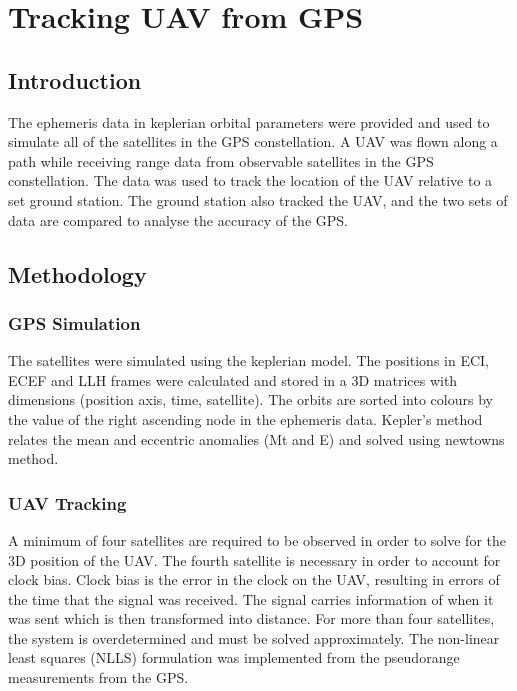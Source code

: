 \documentclass[Space3_Assign2]{subfile}
\begin{document}
\section{Tracking UAV from GPS}
\subsection{Introduction}
The ephemeris data in keplerian orbital parameters were provided and used to simulate all of the satellites in the GPS constellation. A UAV was flown along a path while receiving range data from observable satellites in the GPS constellation. The data was used to track the location of the UAV relative to a set ground station. The ground station also tracked the UAV, and the two sets of data are compared to analyse the accuracy of the GPS. 





\subsection{Methodology}
\subsubsection{GPS Simulation}
The satellites were simulated using the keplerian model. The positions in ECI, ECEF and LLH frames were calculated and stored in a 3D matrices with dimensions (position axis, time, satellite). The orbits are sorted into colours by the value of the right ascending node in the ephemeris data. Kepler's method relates the mean and eccentric anomalies (Mt and E) and solved using newtowns method.

\subsubsection{UAV Tracking}
A minimum of four satellites are required to be observed in order to solve for the 3D position of the UAV. The fourth satellite is necessary in order to account for clock bias. Clock bias is the error in the clock on the UAV, resulting in errors of the time that the signal was received. The signal carries information of when it was sent which is then transformed into distance. For more than four satellites, the system is overdetermined and must be solved approximately. The non-linear least squares (NLLS) formulation was implemented from the pseudorange measurements from the GPS.
\end{document}
